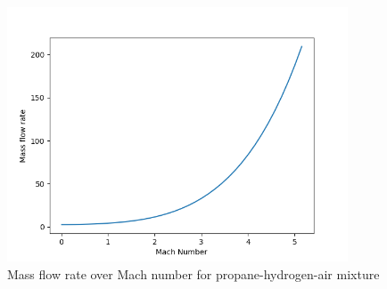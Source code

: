 \documentclass[a4paper,11pt]{article}
\begin{document}
	\begin{figure}[H]
		\centering
		\includegraphics[width=0.9\textwidth]{Propan(1mol)_wodor(0.1mol)_pow/Mass_flow_rate_over_Mach.png}
       		\caption{Mass flow rate over Mach number for propane-hydrogen-air mixture}
	\end{figure}
\end{document}
